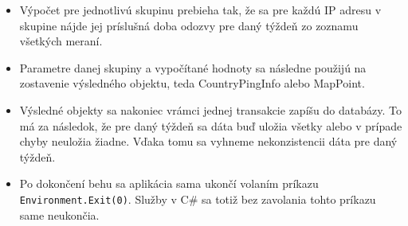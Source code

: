 \begin{itemize}
    \item Výpočet pre jednotlivú skupinu prebieha tak, že sa pre každú IP adresu v skupine nájde jej príslušná doba odozvy pre daný týždeň zo zoznamu 
    všetkých meraní.
    \item Parametre danej skupiny a vypočítané hodnoty sa následne použijú na zostavenie výsledného objektu, teda CountryPingInfo alebo MapPoint.
    \item Výsledné objekty sa nakoniec vrámci jednej transakcie zapíšu do databázy. To má za následok, že pre daný týždeň sa dáta buď uložia všetky alebo 
    v prípade chyby neuložia žiadne. Vďaka tomu sa vyhneme nekonzistencii dáta pre daný týždeň.
    \item Po dokončení behu sa aplikácia sama ukončí volaním príkazu \lstinline{Environment.Exit(0)}. Služby v C\# sa totiž bez zavolania tohto príkazu same 
    neukončia.
\end{itemize}